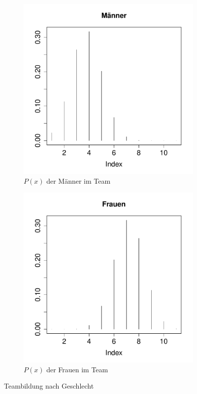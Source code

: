 \begin{figure}[h!]
\centering
\begin{subfigure}[b]{0.48\textwidth}
\includegraphics{verteilungen-004}
\caption{$P(x)$ der Männer im Team}
\end{subfigure}
\begin{subfigure}[b]{0.48\textwidth}
\centering
\includegraphics{verteilungen-005}
\caption{$P(x)$ der Frauen im Team}
\end{subfigure}
\caption{Teambildung nach Geschlecht}
\label{fig:team}
\end{figure}

